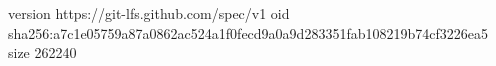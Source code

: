 version https://git-lfs.github.com/spec/v1
oid sha256:a7c1e05759a87a0862ac524a1f0fecd9a0a9d283351fab108219b74cf3226ea5
size 262240

